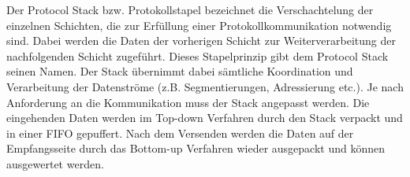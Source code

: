 Der Protocol Stack bzw. Protokollstapel bezeichnet die Verschachtelung der
einzelnen Schichten, die zur Erf{\"u}llung einer Protokollkommunikation
notwendig sind. Dabei werden die Daten der vorherigen Schicht zur
Weiterverarbeitung der nachfolgenden Schicht zugef{\"u}hrt. Dieses Stapelprinzip
gibt dem Protocol Stack seinen Namen. Der Stack {\"u}bernimmt dabei
s{\"a}mtliche Koordination und Verarbeitung der Datenstr{\"o}me (z.B.
Segmentierungen, Adressierung etc.).
Je nach Anforderung an die Kommunikation muss der Stack angepasst werden. Die
eingehenden Daten werden im Top-down Verfahren durch den Stack verpackt
und in einer \gls{FIFO} gepuffert. Nach dem Versenden werden die
Daten auf der Empfangsseite durch das Bottom-up Verfahren wieder ausgepackt und k{\"o}nnen
ausgewertet werden.
